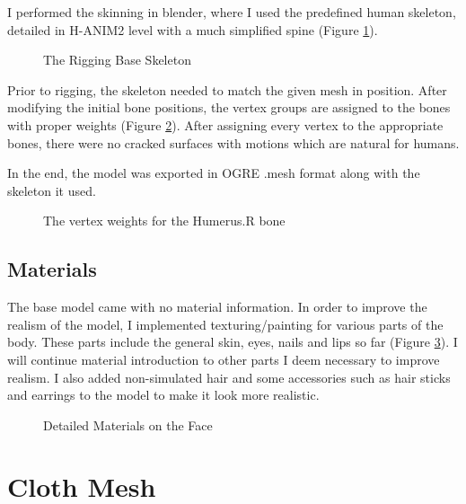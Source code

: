 I performed the skinning in blender, where I used the predefined human skeleton, detailed in H-ANIM2 level with a much simplified spine (Figure \ref{fig:rigging_skeleton}). 

\begin{figure}[h]
\centerline{}
\caption{The Rigging Base Skeleton}
\label{fig:rigging_skeleton}
\end{figure}

Prior to rigging, the skeleton needed to match the given mesh in position. After modifying the initial bone positions, the vertex groups are assigned to the bones with proper weights (Figure \ref{fig:weight_humerus_r}). After assigning every vertex to the appropriate bones, there were no cracked surfaces with motions which are natural for humans. 

In the end, the model was exported in OGRE .mesh format along with the skeleton it used.

\begin{figure}[h]
\centerline{}
\caption{The vertex weights for the Humerus.R bone}
\label{fig:weight_humerus_r}
\end{figure}

\subsection{Materials}

The base model came with no material information. In order to improve the realism of the model, I implemented texturing/painting for various parts of the body. These parts include the general skin, eyes, nails and lips so far (Figure \ref{fig:detailed_face}).  I will continue material introduction to other parts I deem necessary to improve realism. I also added non-simulated hair and some accessories such as hair sticks and earrings to the model to make it look more realistic.

\begin{figure}[h]
\centerline{}
\caption{Detailed Materials on the Face}
\label{fig:detailed_face}
\end{figure}

\section{Cloth Mesh}
\label{section1_2}

